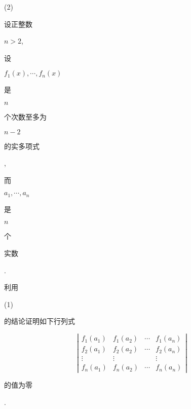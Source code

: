 \documentclass[10pt]{article}
\begin{document}
(2) \begin{CJK}{UTF8}{mj}设正整数\end{CJK} $n>2$, \begin{CJK}{UTF8}{mj}设\end{CJK} $f_{1}(x), \cdots, f_{n}(x)$ \begin{CJK}{UTF8}{mj}是\end{CJK} $n$ \begin{CJK}{UTF8}{mj}个次数至多为\end{CJK} $n-2$ \begin{CJK}{UTF8}{mj}的实多项式\end{CJK}, \begin{CJK}{UTF8}{mj}而\end{CJK} $a_{1}, \cdots, a_{n}$ \begin{CJK}{UTF8}{mj}是\end{CJK} $n$ \begin{CJK}{UTF8}{mj}个\end{CJK} \begin{CJK}{UTF8}{mj}实数\end{CJK}. \begin{CJK}{UTF8}{mj}利用\end{CJK} (1) \begin{CJK}{UTF8}{mj}的结论证明如下行列式\end{CJK}
$$
\left|\begin{array}{cccc}
f_{1}\left(a_{1}\right) & f_{1}\left(a_{2}\right) & \cdots & f_{1}\left(a_{n}\right) \\
f_{2}\left(a_{1}\right) & f_{2}\left(a_{2}\right) & \cdots & f_{2}\left(a_{n}\right) \\
\vdots & \vdots & & \vdots \\
f_{n}\left(a_{1}\right) & f_{n}\left(a_{2}\right) & \cdots & f_{n}\left(a_{n}\right)
\end{array}\right|
$$
\begin{CJK}{UTF8}{mj}的值为零\end{CJK}.
\end{document}
